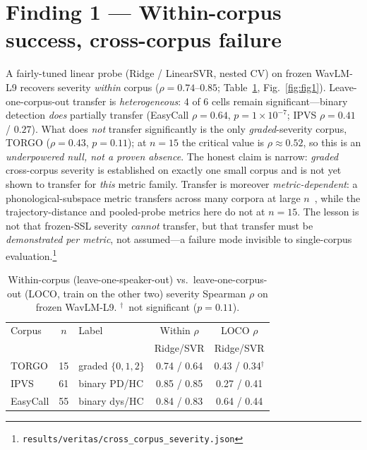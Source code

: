 \documentclass[10pt,twocolumn]{article}
\begin{document}
\section{Finding 1 --- Within-corpus success, cross-corpus failure}
A fairly-tuned linear probe (Ridge / LinearSVR, nested CV) on frozen
WavLM-L9 recovers severity \emph{within} corpus ($\rho{=}0.74$--$0.85$;
Table~\ref{tab:crosscorpus}, Fig.~\ref{fig:fig1}). Leave-one-corpus-out transfer
is \emph{heterogeneous}: 4 of 6 cells remain significant---binary detection
\emph{does} partially transfer (EasyCall $\rho{=}0.64$, $p{=}1{\times}10^{-7}$;
IPVS $\rho{=}0.41$ / $0.27$). What does \emph{not} transfer significantly is the
only \emph{graded}-severity corpus, TORGO ($\rho{=}0.43$, $p{=}0.11$); at
$n{=}15$ the critical value is $\rho{\approx}0.52$, so this is an
\emph{underpowered null, not a proven absence}. The honest claim is narrow:
\emph{graded} cross-corpus severity is established on exactly one small corpus
and is not yet shown to transfer for \emph{this} metric family. Transfer is
moreover \emph{metric-dependent}: a phonological-subspace metric transfers across
many corpora at large $n$~\cite{frozenssl2026b}, while the trajectory-distance and
pooled-probe metrics here do not at $n{=}15$. The lesson is not that frozen-SSL
severity \emph{cannot} transfer, but that transfer must be \emph{demonstrated per
metric}, not assumed---a failure mode invisible to single-corpus evaluation.\footnote{\texttt{results/veritas/cross\_corpus\_severity.json}}

\begin{table}[t]
\centering
\caption{Within-corpus (leave-one-speaker-out) vs.\ leave-one-corpus-out (LOCO,
train on the other two) severity Spearman $\rho$ on frozen WavLM-L9.
$^{\dagger}$~not significant ($p{=}0.11$).}
\label{tab:crosscorpus}
\small
\begin{tabular}{@{}lclcc@{}}
\toprule
Corpus & $n$ & Label & \multicolumn{1}{c}{Within $\rho$} &
\multicolumn{1}{c}{LOCO $\rho$}\\
       &     &       & \small Ridge/SVR & \small Ridge/SVR\\
\midrule
TORGO    & 15 & graded $\{0,1,2\}$ & 0.74 / 0.64 & 0.43 / 0.34$^{\dagger}$\\
IPVS     & 61 & binary PD/HC       & 0.85 / 0.85 & 0.27 / 0.41\\
EasyCall & 55 & binary dys/HC      & 0.84 / 0.83 & 0.64 / 0.44\\
\bottomrule
\end{tabular}
\end{table}
\end{document}
